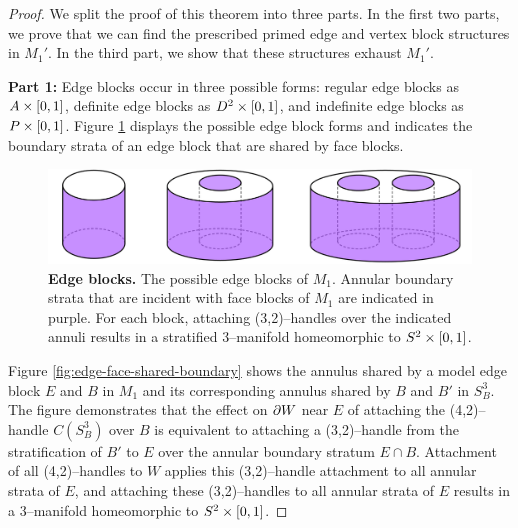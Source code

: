 \begin{proof}
	We split the proof of this theorem into three parts.
	In the first two parts, we prove that we can find the prescribed primed edge and vertex block structures in $M_1'$.
	In the third part, we show that these structures exhaust $M_1'$.
	
	\textbf{Part 1:}
	Edge blocks occur in three possible forms: regular edge blocks as $A\times[0,1]$, definite edge blocks as $D^2\times[0,1]$, and indefinite edge blocks as $P\times[0,1]$.
	Figure \ref{fig:edge-block-incidence} displays the possible edge block forms and indicates the boundary strata of an edge block that are shared by face blocks.
	
	\begin{figure}[h!]
		\centering
		\includegraphics[width=\textwidth]{figures/edge-block-incidence.png}
		\caption{
			\textbf{Edge blocks.}
			The possible edge blocks of $M_1$.
			Annular boundary strata that are incident with face blocks of $M_1$ are indicated in purple.
			For each block, attaching (3,2)--handles over the indicated annuli results in a stratified 3--manifold homeomorphic to $S^2\times[0,1]$.
		}
		\label{fig:edge-block-incidence}
	\end{figure}
	
	Figure \ref{fig:edge-face-shared-boundary} shows the annulus shared by a model edge block $E$ and $B$ in $M_1$ and its corresponding annulus shared by $B$ and $B'$ in $S_B^3$.
	The figure demonstrates that the effect on $\partial W$ near $E$ of attaching the (4,2)--handle $C(S_B^3)$ over $B$ is equivalent to attaching a (3,2)--handle from the stratification of $B'$ to $E$ over the annular boundary stratum $E\cap B$.
	Attachment of all (4,2)--handles to $W$ applies this (3,2)--handle attachment to all annular strata of $E$, and attaching these (3,2)--handles to all annular strata of $E$ results in a 3--manifold homeomorphic to $S^2\times[0,1]$.


\end{proof}
